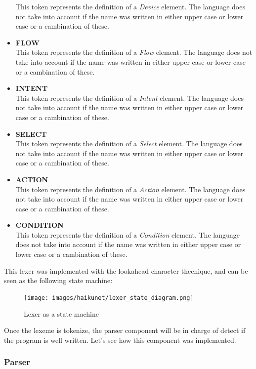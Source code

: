 \begin{itemize}
This token represents the definition of a \textit{Device} element. The language does not take into account if the name was written in either upper case or lower case or a cambination of these.
\item \textbf{FLOW}\\
This token represents the definition of a \textit{Flow} element. The language does not take into account if the name was written in either upper case or lower case or a cambination of these.
\item \textbf{INTENT}\\
This token represents the definition of a \textit{Intent} element. The language does not take into account if the name was written in either upper case or lower case or a cambination of these.
\item \textbf{SELECT}\\
This token represents the definition of a \textit{Select} element. The language does not take into account if the name was written in either upper case or lower case or a cambination of these.
\item \textbf{ACTION}\\
This token represents the definition of a \textit{Action} element. The language does not take into account if the name was written in either upper case or lower case or a cambination of these.
\item \textbf{CONDITION}\\
This token represents the definition of a \textit{Condition} element. The language does not take into account if the name was written in either upper case or lower case or a cambination of these.
\end{itemize}

This lexer was implemented with the lookahead character thecnique, and can be seen as the following state machine:

\begin{figure}[H]
\centering
\texttt{[image: images/haikunet/lexer\_state\_diagram.png]}
\caption{Lexer as a state machine}
\end{figure}

Once the lexeme is tokenize, the parser component will be in charge of detect if the program is well written. Let's see how this component was implemented.

\subsubsection{Parser}

